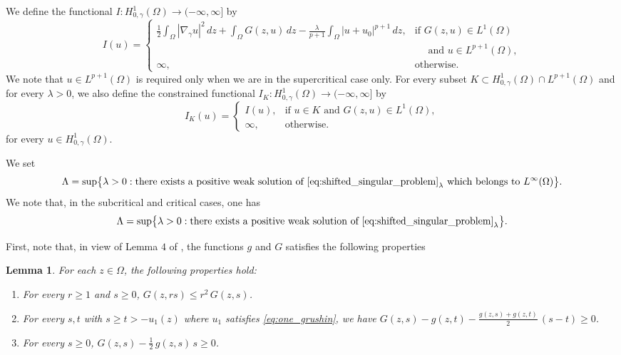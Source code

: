 \documentclass[11pt]{article}
\newtheorem{lemma}{Lemma}[section] %
\newcommand{\om} {\Omega}
\newcommand{\gradgr}{\nabla_{\gamma}}
\newcommand{\spacegr}{H^{1}_{0,\gamma}(\Omega)}
\begin{document}
We define the functional $I : \spacegr \to (-\infty,\infty]$ by
\begin{equation*}
I(u) =
\begin{cases}
\displaystyle
\frac{1}{2} \int_{\Omega} |\gradgr u|^{2}\, dz
+ \int_{\Omega} G(z,u)\, dz
- \frac{\lambda}{p+1} \int_{\Omega} |u + u_{0}|^{p+1}\, dz,
& \text{if } G(z,u) \in L^{1}(\Omega) \\ & \quad  \text{ and } u \in L^{p+1}(\Omega), \\[1.2ex]
\infty, & \text{otherwise}.
\end{cases}
\end{equation*}
We note that $u \in L^{p+1}(\om)$ is required only when we are in the supercritical case only. For every subset $K \subset \spacegr \cap L^{p+1}(\Omega)$ and for every $\lambda>0$, we also define the constrained functional $I_K : \spacegr \to (-\infty,\infty]$ by
\begin{equation*}
I_K(u) =
\begin{cases}
I(u), & \text{if } u \in K \text{ and } G(z,u) \in L^{1}(\Omega), \\
\infty, & \text{otherwise}.
\end{cases}
\end{equation*}
for every $u \in \spacegr$.

We set
\begin{equation*}
\Lambda
= \sup \bigl\{ \lambda>0 : \text{there exists a positive weak solution of } \eqref{eq:shifted_singular_problem}_{\lambda}
\text{ which belongs to } L^{\infty}(\Omega) \bigr\}.
\end{equation*}
We note that, in the subcritical and critical cases, one has
\begin{equation*}
\Lambda
= \sup \bigl\{ \lambda>0 : \text{there exists a positive weak solution of } \eqref{eq:shifted_singular_problem}_{\lambda} \bigr\}.
\end{equation*}

First, note that, in view of Lemma $4$ of \cite{hirano_concave_convex}, the functions $g$ and $G$ satisfies the following properties
\begin{lemma}
\label{lem:properties_of_G}
For each $z \in \Omega$, the following properties hold:
\begin{enumerate}
  \item[(i)]
  For every $r \ge 1$ and $s \ge 0$, $ G(z, r s) \le r^{2} \, G(z, s)$.

  \item[(ii)]
  For every $s,t$ with $s \ge t > -u_1(z)$ where $u_1$ satisfies \eqref{eq:one_grushin}, we have $ G(z, s) - g(z,t) - \frac{ g(z, s) + g(z,t) }{2}\, (s - t) \ge 0$.

  \item[(iii)]
  For every $s \ge 0$, $ G(z, s) - \frac{1}{2} \, g(z, s) \, s \ge 0$.
\end{enumerate}
\end{lemma}
\end{document}
